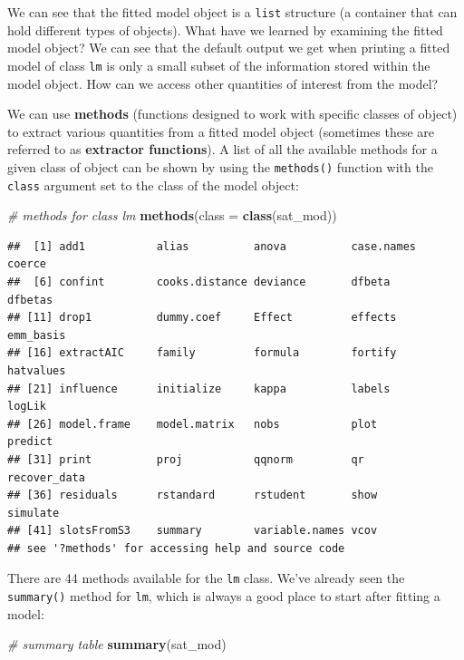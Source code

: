 \documentclass[
]{book}
\newenvironment{Shaded}{\begin{snugshade}}{\end{snugshade}}
\newcommand{\CommentTok}[1]{\textcolor[rgb]{0.56,0.35,0.01}{\textit{#1}}}
\newcommand{\DataTypeTok}[1]{\textcolor[rgb]{0.13,0.29,0.53}{#1}}
\newcommand{\KeywordTok}[1]{\textcolor[rgb]{0.13,0.29,0.53}{\textbf{#1}}}
\newcommand{\NormalTok}[1]{#1}
\begin{document}
We can see that the fitted model object is a \texttt{list} structure (a container that can hold different types of objects). What have we learned by examining the fitted model object? We can see that the default output we get when printing a fitted model of class \texttt{lm} is only a small subset of the information stored within the model object. How can we access other quantities of interest from the model?

We can use \textbf{methods} (functions designed to work with specific classes of object) to extract various quantities from a fitted model object (sometimes these are referred to as \textbf{extractor functions}). A list of all the available methods for a given class of object can be shown by using the \texttt{methods()} function with the \texttt{class} argument set to the class of the model object:

\begin{Shaded}
\begin{Highlighting}[]
  \CommentTok{\# methods for class \textasciigrave{}lm\textasciigrave{}}
  \KeywordTok{methods}\NormalTok{(}\DataTypeTok{class =} \KeywordTok{class}\NormalTok{(sat\_mod))}
\end{Highlighting}
\end{Shaded}

\begin{verbatim}
##  [1] add1           alias          anova          case.names     coerce        
##  [6] confint        cooks.distance deviance       dfbeta         dfbetas       
## [11] drop1          dummy.coef     Effect         effects        emm_basis     
## [16] extractAIC     family         formula        fortify        hatvalues     
## [21] influence      initialize     kappa          labels         logLik        
## [26] model.frame    model.matrix   nobs           plot           predict       
## [31] print          proj           qqnorm         qr             recover_data  
## [36] residuals      rstandard      rstudent       show           simulate      
## [41] slotsFromS3    summary        variable.names vcov          
## see '?methods' for accessing help and source code
\end{verbatim}

There are 44 methods available for the \texttt{lm} class. We've already seen the \texttt{summary()} method for \texttt{lm}, which is always a good place to start after fitting a model:

\begin{Shaded}
\begin{Highlighting}[]
  \CommentTok{\# summary table}
  \KeywordTok{summary}\NormalTok{(sat\_mod) }
\end{Highlighting}
\end{Shaded}
\end{document}
